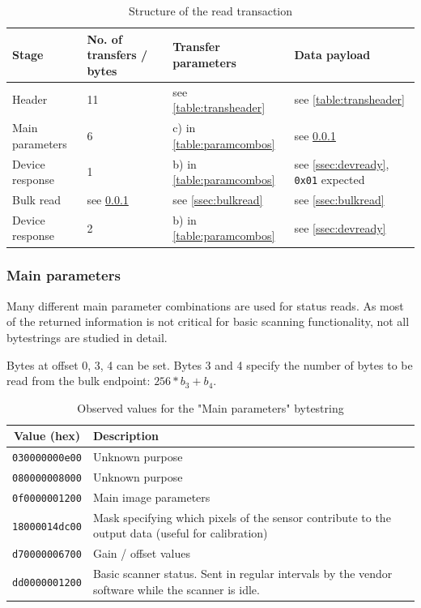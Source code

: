 \documentclass{article}
\begin{document}
\begin{table}[H]
  \caption{Structure of the read transaction}
  \centering
  \begin{tabular}{p{3cm} | p{1.5cm} | p{3cm} | p{3cm}}
    Stage & No. of transfers / bytes & Transfer parameters & Data payload \\ \hline
    
    Header & 11 & see \autoref{table:transheader} & see \autoref{table:transheader} \\
    Main parameters & 6 & c) in \autoref{table:paramcombos} & see \ref{ssec:read_param} \\
    Device response & 1 & b) in \autoref{table:paramcombos} & see \ref{ssec:devready}, {\tt 0x01} expected \\
    Bulk read & see \ref{ssec:read_param} & see \ref{ssec:bulkread} & see \ref{ssec:bulkread} \\
    Device response & 2 & b) in \autoref{table:paramcombos} & see \ref{ssec:devready} \\
  \end{tabular}
\end{table}

\subsubsection{Main parameters}
\label{ssec:read_param}

Many different main parameter combinations are used for status reads. As most of the returned
information is not critical for basic scanning functionality, not all bytestrings are
studied in detail.

Bytes at offset 0, 3, 4 can be set. Bytes 3 and 4 specify the number of bytes to
be read from the bulk endpoint: $256 * b_3 + b_4$.

\begin{table}[H]
  \caption{Observed values for the "Main parameters" bytestring}
  \centering
  \begin{tabular}{c | p{7cm}}
    Value (hex) & Description \\ \hline
    {\tt 030000000e00} & Unknown purpose \\
    {\tt 080000008000} & Unknown purpose \\
    {\tt 0f0000001200} & Main image parameters \\
    {\tt 18000014dc00} & Mask specifying which pixels of the sensor contribute to the output data (useful for calibration) \\
    {\tt d70000006700} & Gain / offset values \\
    {\tt dd0000001200} & Basic scanner status. Sent in regular intervals by the vendor software while the scanner is idle. \\

  \end{tabular}
  \label{table:read_param}
\end{table}
\end{document}

